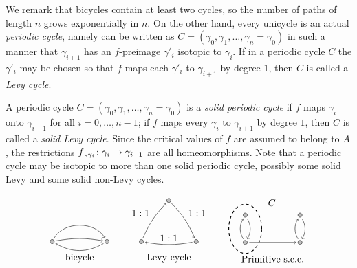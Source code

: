 \documentclass{amsart}
\begin{document}
We remark that bicycles contain at least two cycles, so the number of
paths of length $n$ grows exponentially in $n$. On the other hand,
every unicycle is an actual \emph{periodic cycle}, namely can be
written as $C=(\gamma_0,\gamma_1,\dots,\gamma_n=\gamma_0)$ in such a
manner that $\gamma_{i+1}$ has an $f$-preimage $\gamma'_i$ isotopic to
$\gamma_i$. If in a periodic cycle $C$ the $\gamma'_i$ may be chosen
so that $f$ maps each $\gamma'_i$ to $\gamma_{i+1}$ by degree $1$,
then $C$ is called a \emph{Levy cycle}.

A periodic cycle $C=(\gamma_0,\gamma_1,\dots,\gamma_n=\gamma_0)$ is a
\emph{solid periodic cycle} if $f$ maps $\gamma_i$ onto $\gamma_{i+1}$
for all $i=0,\dots,n-1$; if $f$ maps every $\gamma_i$ to
$\gamma_{i+1}$ by degree $1$, then $C$ is called a \emph{solid Levy
  cycle}. Since the critical values of $f$ are assumed to belong to
$A$, the restrictions
$f\!\downharpoonleft_{\!\gamma_i}\colon\gamma_i\to\gamma_{i+1}$ are all
homeomorphisms. Note that a periodic cycle may be isotopic to more
than one solid periodic cycle, possibly some solid Levy and some solid
non-Levy cycles.

\[\begin{tikzpicture}[->,auto,vx/.style={circle,minimum size=1ex,inner sep=0pt,outer sep=2pt,draw,fill=gray!50}]
  \node[vx] (1) at (-1,0) {};
  \node[vx] (2) at (1,0) {};
  \draw (1)  to [bend left=60] (2);
  \draw (1)  to [bend left=10] (2);
  \draw (2)  to [bend left] (1);
  \node at (0,-0.6) {bicycle};
\end{tikzpicture}
\qquad
\begin{tikzpicture}[->,auto,vx/.style={circle,minimum size=1ex,inner sep=0pt,outer sep=2pt,draw,fill=gray!50}]
  \node[vx] (1) at (-1,0) {};
  \node[vx] (2) at (0,1.5) {};
  \node[vx] (3) at (1,0) {};
  \draw (1)  to [bend left=10] node {$1:1$} (2);
  \draw (2)  to [bend left=10] node {$1:1$} (3);
  \draw (3)  to [bend left=10] node [above] {$1:1$} (1);
  \node at (0,-0.6) {Levy cycle};
\end{tikzpicture}
\qquad
\begin{tikzpicture}[->,auto,vx/.style={circle,minimum size=1ex,inner sep=0pt,outer sep=2pt,draw,fill=gray!50}]
  \node[vx] (1) at (-1,0) {};
  \node[vx] (2) at (-1,1) {};
  \node[vx] (3) at (1,0) {};
  \node[vx] (4) at (1,1) {};
  \draw[dashed,thick] (-1,0.5) ellipse (6mm and 9mm) node[above right=7mm] {$C$};
  \draw (1)  to [bend left] (2);
  \draw (2)  to [bend left] (1);
  \draw (1)  to (3);
  \draw (3)  to [bend left] (4);
  \draw (4)  to [bend left] (3);
  \node at (0,-0.6) {Primitive s.c.c.};
\end{tikzpicture}
\]
\end{document}
